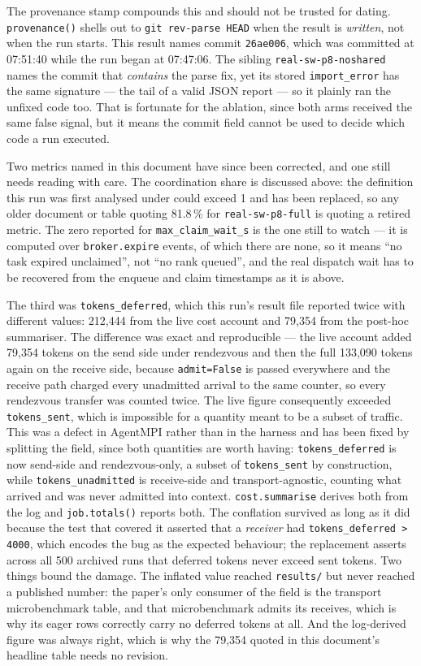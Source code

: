 \documentclass[11pt]{article}
\begin{document}
The provenance stamp compounds this and should not be trusted for dating. \texttt{provenance()}
shells out to \texttt{git rev-parse HEAD} when the result is \emph{written}, not when the run
starts. This result names commit \texttt{26ae006}, which was committed at 07:51:40 while the
run began at 07:47:06. The sibling \texttt{real-sw-p8-noshared} names the commit that
\emph{contains} the parse fix, yet its stored \texttt{import\_error} has the same signature ---
the tail of a valid JSON report --- so it plainly ran the unfixed code too. That is fortunate
for the ablation, since both arms received the same false signal, but it means the commit field
cannot be used to decide which code a run executed.

Two metrics named in this document have since been corrected, and one still needs reading with
care. The coordination share is discussed above: the definition this run was first analysed
under could exceed 1 and has been replaced, so any older document or table quoting 81.8\,\% for
\texttt{real-sw-p8-full} is quoting a retired metric. The zero reported for
\texttt{max\_claim\_wait\_s} is the one still to watch --- it is computed
over \texttt{broker.expire} events, of which there are none, so it means ``no task expired
unclaimed'', not ``no rank queued'', and the real dispatch wait has to be recovered from the
enqueue and claim timestamps as it is above.

The third was \texttt{tokens\_deferred}, which this run's result file reported twice with
different values: 212{,}444 from the live cost account and 79{,}354 from the post-hoc
summariser. The difference was exact and reproducible --- the live account added 79{,}354
tokens on the send side under rendezvous and then the full 133{,}090 tokens again on the
receive side, because \texttt{admit=False} is passed everywhere and the receive path charged
every unadmitted arrival to the same counter, so every rendezvous transfer was counted twice.
The live figure consequently exceeded \texttt{tokens\_sent}, which is impossible for a quantity
meant to be a subset of traffic. This was a defect in AgentMPI rather than in the harness and
has been fixed by splitting the field, since both quantities are worth having:
\texttt{tokens\_deferred} is now send-side and rendezvous-only, a subset of
\texttt{tokens\_sent} by construction, while \texttt{tokens\_unadmitted} is receive-side and
transport-agnostic, counting what arrived and was never admitted into context.
\texttt{cost.summarise} derives both from the log and \texttt{job.totals()} reports both. The
conflation survived as long as it did because the test that covered it asserted that a
\emph{receiver} had \texttt{tokens\_deferred > 4000}, which encodes the bug as the expected
behaviour; the replacement asserts across all 500 archived runs that deferred tokens never
exceed sent tokens. Two things bound the damage. The inflated value reached \texttt{results/}
but never reached a published number: the paper's only consumer of the field is the transport
microbenchmark table, and that microbenchmark admits its receives, which is why its eager rows
correctly carry no deferred tokens at all. And the log-derived figure was always right, which
is why the 79{,}354 quoted in this document's headline table needs no revision.
\end{document}
